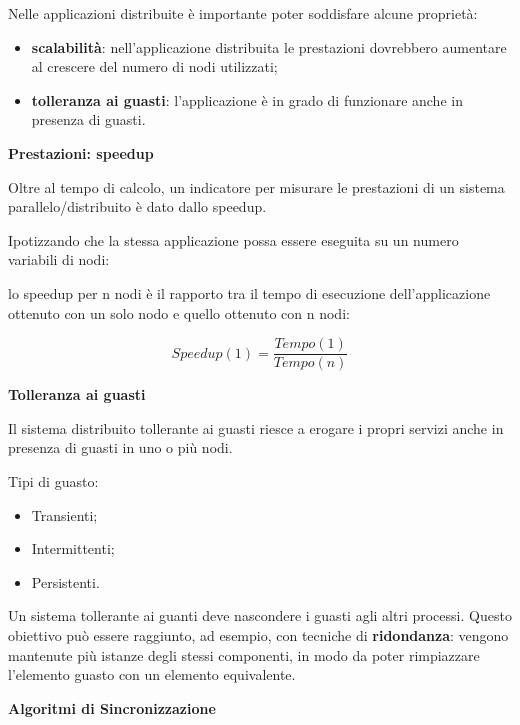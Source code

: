 \documentclass{article}
\begin{document}
\vspace{3mm}
Nelle applicazioni distribuite è importante poter soddisfare alcune proprietà:
\begin{itemize}
    \item \textbf{scalabilità}: nell'applicazione distribuita le prestazioni dovrebbero aumentare al crescere del numero di nodi utilizzati;
    \item \textbf{tolleranza ai guasti}: l'applicazione è in grado di funzionare anche in presenza di guasti.
\end{itemize}

\vspace{5mm}
\textbf{Prestazioni: speedup}

\vspace{3mm}
Oltre al tempo di calcolo, un indicatore per misurare le prestazioni di un sistema parallelo/distribuito è dato dallo speedup.

Ipotizzando che la stessa applicazione possa essere eseguita su un numero variabili di nodi:

lo speedup per n nodi è il rapporto tra il tempo di esecuzione dell'applicazione ottenuto con un solo nodo e quello ottenuto con n nodi:

\begin{center}
    \[Speedup(1) = \frac{Tempo(1)}{Tempo(n)}\]
\end{center}

\vspace{5mm}
\textbf{Tolleranza ai guasti}

\vspace{3mm}
Il sistema distribuito tollerante ai guasti riesce a erogare i propri servizi anche in presenza di guasti in uno o più nodi.

Tipi di guasto:
\begin{itemize}
    \item Transienti;
    \item Intermittenti;
    \item Persistenti.
\end{itemize}

Un sistema tollerante ai guanti deve nascondere i guasti agli altri processi. Questo obiettivo può essere raggiunto, ad esempio, con tecniche di \textbf{ridondanza}:
vengono mantenute più istanze degli stessi componenti, in modo da poter rimpiazzare l'elemento guasto con un elemento equivalente.

\vspace{5mm}
\textbf{Algoritmi di Sincronizzazione}
\end{document}
